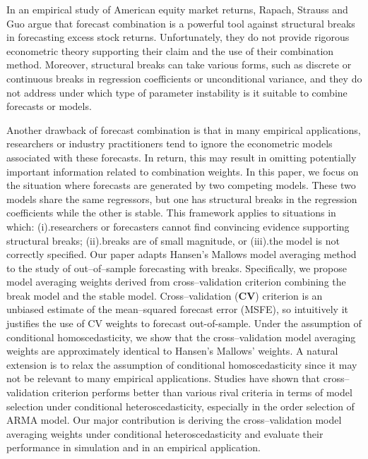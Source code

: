 In an empirical study of American equity market returns, Rapach, Strauss and Guo \cite{rsz2010} argue that forecast combination is a powerful tool against structural breaks in forecasting excess stock returns. Unfortunately, they do not provide rigorous econometric theory supporting their claim and the use of their combination method. Moreover, structural breaks can take various forms, such as discrete or continuous breaks in regression coefficients or unconditional variance, and they do not address under which type of parameter instability is it suitable to combine forecasts or models.

Another drawback of forecast combination is that in many empirical applications, researchers or industry practitioners tend to ignore the econometric models associated with these forecasts. In return, this may result in omitting potentially important information related to combination weights. In this paper, we focus on the situation where forecasts are generated by two competing models. These two models share the same regressors, but one has structural breaks in the regression coefficients while the other is stable. This framework applies to situations in which: (i).researchers or forecasters cannot find convincing evidence supporting structural breaks; (ii).breaks are of small magnitude, or (iii).the model is not correctly specified. Our paper adapts Hansen's Mallows model averaging method \cite{hansen2009averaging} to the study of out--of--sample forecasting with breaks. Specifically, we propose model averaging weights derived from cross--validation criterion combining the break model and the stable model. Cross--validation (\textbf{CV}) criterion is an unbiased estimate of the mean--squared forecast error (MSFE), so intuitively it justifies the use of CV weights to forecast out-of-sample. Under the assumption of conditional homoscedasticity, we show that the cross--validation model averaging weights are approximately identical to Hansen's Mallows' weights. A natural extension is to relax the assumption of conditional homoscedasticity since it may not be relevant to many empirical applications. Studies have shown that cross--validation criterion performs better than various rival criteria in terms of model selection under conditional heteroscedasticity, especially in the order selection of ARMA model. Our major contribution is deriving the cross--validation model averaging weights under conditional heteroscedasticity and evaluate their performance in simulation and in an empirical application. 